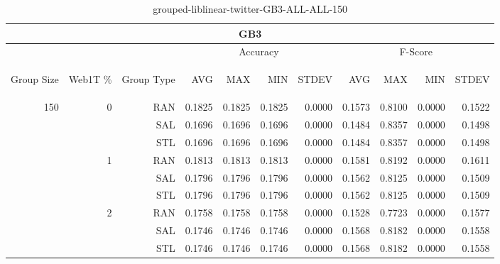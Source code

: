 \begin{center}
\begin{table}[htbp]
\begin{tabular}{ | r | r | r | r | r | r | r | r | r | r | r |}
\hline
\multicolumn{11}{|c|}{GB3}\\
\hline
 & & & \multicolumn{4}{|c|}{Accuracy} & \multicolumn{4}{|c|}{F-Score}\\ \cline{4-11}
\begin{sideways}Group Size\end{sideways} & \begin{sideways}Web1T \%\end{sideways} & \begin{sideways}Group Type\end{sideways} & \begin{sideways}AVG\end{sideways} & \begin{sideways}MAX\end{sideways} & \begin{sideways}MIN\end{sideways} & \begin{sideways}STDEV\end{sideways} & \begin{sideways}AVG\end{sideways} & \begin{sideways}MAX\end{sideways} & \begin{sideways}MIN\end{sideways} & \begin{sideways}STDEV\end{sideways}\\
\hline
\multirow{9}{*}{150}
 & \multirow{3}{*}{0} & RAN & 0.1825 & 0.1825 & 0.1825 & 0.0000 & 0.1573 & 0.8100 & 0.0000 & 0.1522\\ \cline{3-11}
 &   & SAL & 0.1696 & 0.1696 & 0.1696 & 0.0000 & 0.1484 & 0.8357 & 0.0000 & 0.1498\\ \cline{3-11}
 &   & STL & 0.1696 & 0.1696 & 0.1696 & 0.0000 & 0.1484 & 0.8357 & 0.0000 & 0.1498\\ \cline{2-11}
 & \multirow{3}{*}{1} & RAN & 0.1813 & 0.1813 & 0.1813 & 0.0000 & 0.1581 & 0.8192 & 0.0000 & 0.1611\\ \cline{3-11}
 &   & SAL & 0.1796 & 0.1796 & 0.1796 & 0.0000 & 0.1562 & 0.8125 & 0.0000 & 0.1509\\ \cline{3-11}
 &   & STL & 0.1796 & 0.1796 & 0.1796 & 0.0000 & 0.1562 & 0.8125 & 0.0000 & 0.1509\\ \cline{2-11}
 & \multirow{3}{*}{2} & RAN & 0.1758 & 0.1758 & 0.1758 & 0.0000 & 0.1528 & 0.7723 & 0.0000 & 0.1577\\ \cline{3-11}
 &   & SAL & 0.1746 & 0.1746 & 0.1746 & 0.0000 & 0.1568 & 0.8182 & 0.0000 & 0.1558\\ \cline{3-11}
 &   & STL & 0.1746 & 0.1746 & 0.1746 & 0.0000 & 0.1568 & 0.8182 & 0.0000 & 0.1558\\ \cline{2-11}
\hline
\end{tabular}
\caption{grouped-liblinear-twitter-GB3-ALL-ALL-150}
\end{table}
\end{center}

